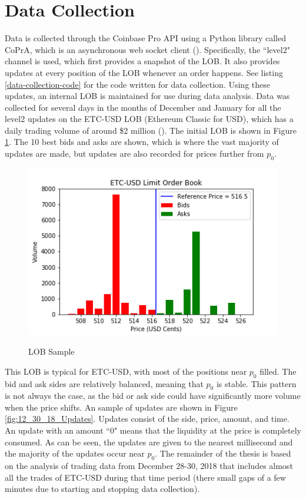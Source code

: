 \section{Data Collection}
Data is collected through the Coinbase Pro API using a Python library called CoPrA, which is an asynchronous web socket client (\cite{L3}). Specifically, the ``level2" channel is used, which first provides a snapshot of the LOB. It also provides updates at every position of the LOB whenever an order happens. See listing \ref{data-collection-code} for the code written for data collection. Using these updates, an internal LOB is maintained for use during data analysis. Data was collected for several days in the months of December and January for all the level2 updates on the ETC-USD LOB (Ethereum Classic for USD), which has a daily trading volume of around \$2 million (\cite{L1}). The initial LOB is shown in Figure \ref{fig:12_30_18_LOB_pic}. The 10 best bids and asks are shown, which is where the vast majority of updates are made, but updates are also recorded for prices further from $p_0$.

\begin{figure}[t]
\begin{center}
\caption{LOB Sample}
\includegraphics[width=\textwidth]{Figures/12_30_18_LOB.png}
\label{fig:12_30_18_LOB_pic}
\end{center}
\end{figure}

This LOB is typical for ETC-USD, with most of the positions near $p_0$ filled. The bid and ask sides are relatively balanced, meaning that $p_0$ is stable. This pattern is not always the case, as the bid or ask side could have significantly more volume when the price shifts. An sample of updates are shown in Figure \ref{fig:12_30_18_Updates}. Updates consist of the side, price, amount, and time. An update with an amount ``0" means that the liquidity at the price is completely consumed. As can be seen, the updates are given to the nearest millisecond and the majority of the updates occur near $p_0$. The remainder of the thesis is based on the analysis of trading data from December 28-30, 2018 that includes almost all the trades of ETC-USD during that time period (there small gaps of a few minutes due to starting and stopping data collection).

